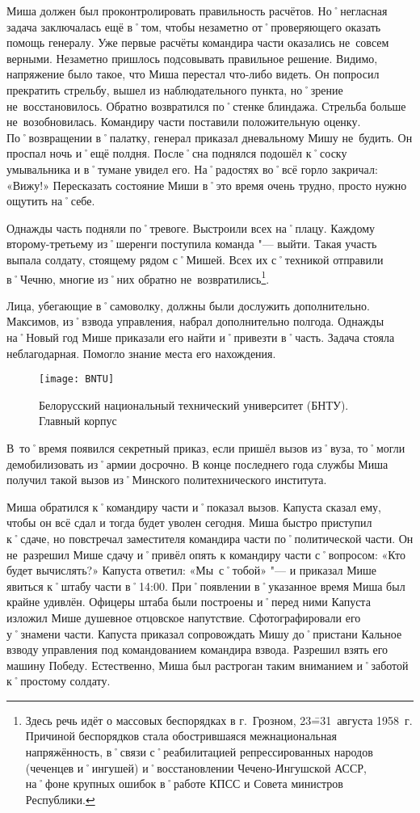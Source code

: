 Миша должен был проконтролировать правильность расчётов. Но˚негласная задача заключалась ещё в˚том, чтобы незаметно от˚проверяющего оказать помощь генералу. Уже первые расчёты командира части оказались не~совсем верными. Незаметно пришлось подсовывать правильное решение. Видимо, напряжение было такое, что Миша перестал что-либо видеть. Он попросил прекратить стрельбу, вышел из наблюдательного пункта, но˚зрение не~восстановилось. Обратно возвратился по˚стенке блиндажа. Стрельба больше не~возобновилась. Командиру части поставили положительную оценку. По˚возвращении в˚палатку, генерал приказал дневальному Мишу не~будить. Он проспал ночь и˚ещё полдня. После˚сна поднялся подошёл к˚соску умывальника и в˚тумане увидел его. На˚радостях во˚всё горло закричал: «Вижу!» Пересказать состояние Миши в˚это время очень трудно, просто нужно ощутить на˚себе.

Однажды часть подняли по˚тревоге. Выстроили всех на˚плацу. Каждому второму\--третьему из˚шеренги поступила команда "--- выйти. Такая участь выпала солдату, стоящему рядом с˚Мишей. Всех их с˚техникой отправили в˚Чечню, многие из˚них обратно не~возвратились\footnote
{Здесь речь идёт о массовых беспорядках в г.~Грозном, 23\==31~августа 1958~г. Причиной беспорядков стала обострившаяся межнациональная напряжённость, в˚связи с˚реабилитацией репрессированных народов (чеченцев и˚ингушей) и˚восстановлении Чечено-Ингушской АССР, на˚фоне крупных ошибок в˚работе КПСС и Совета министров Республики.}. 

Лица, убегающие в˚самоволку, должны были дослужить дополнительно. Максимов, из˚взвода управления, набрал дополнительно полгода. Однажды на˚Новый год Мише приказали его найти и˚привезти в˚часть. Задача стояла неблагодарная. Помогло знание места его нахождения. 

\begin{wrapfigure}{O}{.4\textwidth}
\centering
\texttt{[image: BNTU]}
\caption[Белорусский национальный технический университет (БНТУ). Главный корпус]{Белорусский национальный технический университет (БНТУ). Главный корпус\footnotemark}
\label{fig:BNTU}
\end{wrapfigure}

В~то˚время появился секретный приказ, если пришёл вызов из˚вуза, то˚могли демобилизовать из˚армии досрочно. В конце последнего года службы Миша получил такой вызов из˚Минского политехнического института. 

Миша обратился к˚командиру части и˚показал вызов. Капуста сказал ему, чтобы он всё сдал и тогда будет уволен сегодня. Миша быстро приступил к˚сдаче, но повстречал заместителя командира части по˚политической части. Он не~разрешил Мише сдачу и˚привёл опять к командиру части с˚вопросом: «Кто будет вычислять?» Капуста ответил: «Мы~с˚тобой» "--- и приказал Мише явиться к˚штабу части в˚14:00. При˚появлении в˚указанное время Миша был крайне удивлён. Офицеры штаба были построены и˚перед ними Капуста изложил Мише душевное отцовское напутствие. Сфотографировали его у˚знамени части. Капуста приказал сопровождать Мишу до˚пристани Кальное взводу управления под командованием командира взвода. Разрешил взять его машину Победу. Естественно, Миша был растроган таким вниманием и˚заботой к˚простому солдату. 

